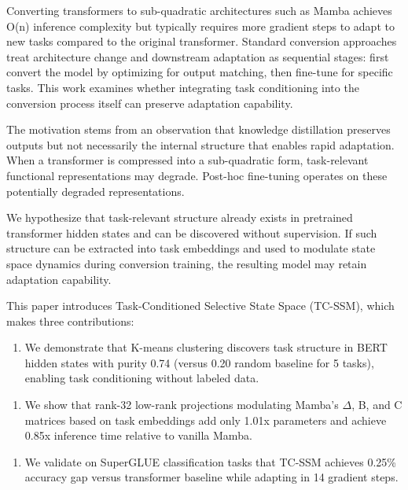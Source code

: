 
Converting transformers to sub-quadratic architectures such as Mamba achieves O(n) inference complexity but typically requires more gradient steps to adapt to new tasks compared to the original transformer. Standard conversion approaches treat architecture change and downstream adaptation as sequential stages: first convert the model by optimizing for output matching, then fine-tune for specific tasks. This work examines whether integrating task conditioning into the conversion process itself can preserve adaptation capability.

The motivation stems from an observation that knowledge distillation preserves outputs but not necessarily the internal structure that enables rapid adaptation. When a transformer is compressed into a sub-quadratic form, task-relevant functional representations may degrade. Post-hoc fine-tuning operates on these potentially degraded representations.

We hypothesize that task-relevant structure already exists in pretrained transformer hidden states and can be discovered without supervision. If such structure can be extracted into task embeddings and used to modulate state space dynamics during conversion training, the resulting model may retain adaptation capability.

This paper introduces Task-Conditioned Selective State Space (TC-SSM), which makes three contributions:

\begin{enumerate}
\item We demonstrate that K-means clustering discovers task structure in BERT hidden states with purity 0.74 (versus 0.20 random baseline for 5 tasks), enabling task conditioning without labeled data.
\end{enumerate}

\begin{enumerate}
\item We show that rank-32 low-rank projections modulating Mamba's $\Delta$, B, and C matrices based on task embeddings add only 1.01x parameters and achieve 0.85x inference time relative to vanilla Mamba.
\end{enumerate}

\begin{enumerate}
\item We validate on SuperGLUE classification tasks that TC-SSM achieves 0.25\% accuracy gap versus transformer baseline while adapting in 14 gradient steps.
\end{enumerate}

